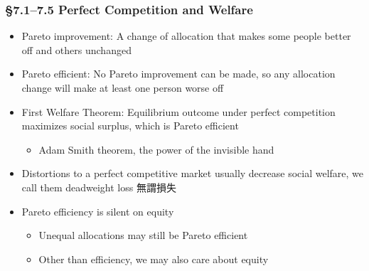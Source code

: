 \documentclass[12pt, xcolor=dvipsnames]{beamer}
\begin{document}
\begin{frame}
\frametitle{\bf §7.1--7.5 Perfect Competition and Welfare}
\begin{itemize}
	\item Pareto improvement: A change of allocation that makes some people better off and others unchanged
	\item Pareto efficient: No Pareto improvement can be made, so any allocation change will make at least one person worse off
	\item First Welfare Theorem: Equilibrium outcome under perfect competition maximizes social surplus, which is Pareto efficient
	\begin{itemize}
		\item Adam Smith theorem, the power of the invisible hand
	\end{itemize}
	\item Distortions to a perfect competitive market usually decrease social welfare, we call them deadweight loss 無謂損失
	\item Pareto efficiency is silent on equity
	\begin{itemize}
		\item Unequal allocations may still be Pareto efficient
		\item Other than efficiency, we may also care about equity
	\end{itemize}
\end{itemize}
\end{frame}
\end{document}
